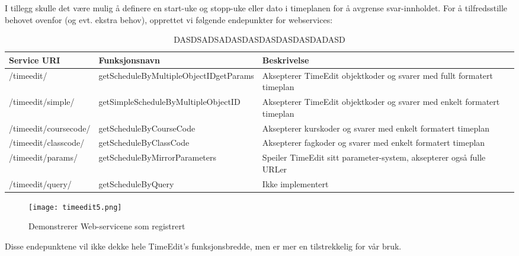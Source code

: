 \documentclass[../main.tex]{subfiles}
\begin{document}
I tillegg skulle det være mulig å definere en start-uke og stopp-uke eller dato i timeplanen for å avgrense svar-innholdet.\newline
For å tilfredsstille behovet ovenfor (og evt. ekstra behov), opprettet vi følgende endepunkter for webservices:

\begin{table}[H]
\begin{center}
\caption{DASDSADSADASDASDASDASDASDADASD}
  \begin{tabular}{ | p{4cm} | p{6cm} | p{6cm} |}
    \hline
    Service URI & Funksjonsnavn & Beskrivelse \\ \hline
    /timeedit/ & getScheduleByMultipleObjectID\newline getParams & Aksepterer TimeEdit objektkoder og svarer med fullt formatert timeplan \\ \hline
    /timeedit/simple/ & getSimpleScheduleByMultipleObjectID & Aksepterer TimeEdit objektkoder og svarer med enkelt formatert timeplan \\ \hline
    /timeedit/coursecode/ & getScheduleByCourseCode & Aksepterer kurskoder og svarer med enkelt formatert timeplan \\ \hline
    /timeedit/classcode/ & getScheduleByClassCode & Aksepterer fagkoder og svarer med enkelt formatert timeplan \\ \hline
    /timeedit/params/ & getScheduleByMirrorParameters & Speiler TimeEdit sitt parameter-system, aksepterer også fulle URLer \\ \hline
    /timeedit/query/ & getScheduleByQuery & Ikke implementert \\
    \hline
  \end{tabular}
\end{center}
\end{table}

\begin{figure}[H]
  \centering
  \texttt{[image: timeedit5.png]}
  \caption{Demonstrerer Web-servicene som registrert}
\end{figure}

Disse endepunktene vil ikke dekke hele TimeEdit’s funksjonsbredde, men er mer en tilstrekkelig for vår bruk. 
\end{document}
